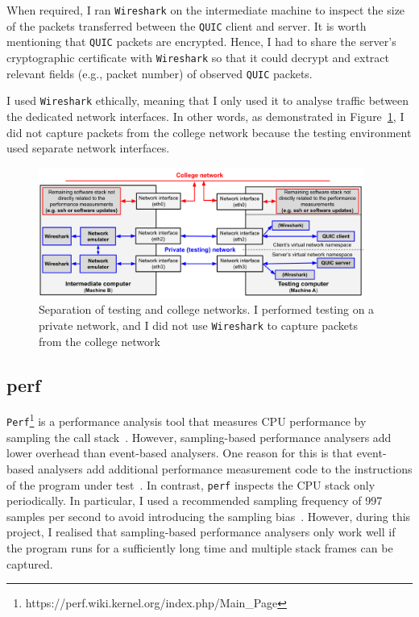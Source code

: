 \documentclass[12pt,a4paper]{report}
\begin{document}
When required, I ran \texttt{Wireshark} on the intermediate machine to inspect the size of the packets transferred between the \texttt{QUIC} client and server.
It is worth mentioning that \texttt{QUIC} packets are encrypted.
Hence, I had to share the server's cryptographic certificate with \texttt{Wireshark} so that it could decrypt and extract relevant fields (e.g., packet number) of observed \texttt{QUIC} packets.

I used \texttt{Wireshark} ethically, meaning that I only used it to analyse traffic between the dedicated network interfaces.
In other words, as demonstrated in Figure~\ref{fig:Wireshark_separation}, I did not capture packets from the college network because the testing environment used separate network interfaces. 

    \begin{figure}[htbp]
    \centering
    \includegraphics[width=0.95\textwidth]{figs/Wireshark_separation.png}
    \caption[Separation of testing and college networks]{Separation of testing and college networks. I performed testing on a private network, and I did not use \texttt{Wireshark} to capture packets from the college network}
    \label{fig:Wireshark_separation}
    \end{figure}



\subsection{perf}
\texttt{Perf}\footnote{https://perf.wiki.kernel.org/index.php/Main\_Page} is a performance analysis tool that measures CPU performance by sampling the call stack~\cite{CPU_Flame_graphs}.
However, sampling-based performance analysers add lower overhead than event-based analysers.
One reason for this is that event-based analysers add additional performance measurement code to the instructions of the program under test~\cite{CPU_Flame_graphs}.
In contrast, \texttt{perf} inspects the CPU stack only periodically.
In particular, I used a recommended sampling frequency of 997 samples per second to avoid introducing the sampling bias~\cite{perf-cpu-sample}.
However, during this project, I realised that sampling-based performance analysers only work well if the program runs for a sufficiently long time and multiple stack frames can be captured.
\end{document}
